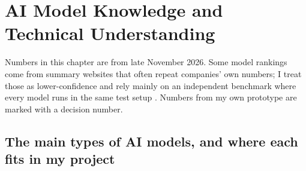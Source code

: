 \chapter{AI Model Knowledge and Technical Understanding}
\label{sec:models}
Numbers in this chapter are from late November 2026. Some model rankings come from summary websites that often repeat
companies' own numbers; I treat those as lower-confidence and rely mainly on an independent benchmark where every model
runs in the same test setup \citep{valstb4}. Numbers from my own prototype are marked with a decision number.

\section{The main types of AI models, and where each fits in my project}

